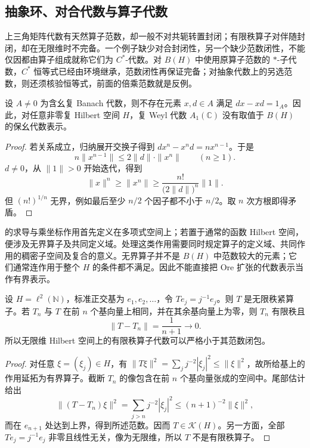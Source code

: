 \subsection{抽象环、对合代数与算子代数}
\label{b2:subsec:D01:03}

上三角矩阵代数有天然算子范数，却一般不对共轭转置封闭；有限秩算子对伴随封闭，却在无限维时不完备。一个例子缺少对合封闭性，另一个缺少范数闭性，不能仅因都由算子组成就称它们为 \(C^*\)-代数。对 \(B(H)\) 中使用原算子范数的 \(*\)-子代数，\(C^*\) 恒等式已经由环境继承，范数闭性再保证完备；对抽象代数上的另选范数，则还须核验恒等式，前面的倍乘范数就是反例。

\begin{proposition}\label{b2:prop:bounded-weyl-impossible}
	设 \(A\ne0\) 为含幺复 Banach 代数，则不存在元素 \(x,d\in A\) 满足 \(dx-xd=1_A\)。因此，对任意非零复 Hilbert 空间 \(H\)，复 Weyl 代数 \(A_1(\mathbb C)\) 没有取值于 \(B(H)\) 的保幺代数表示。
\end{proposition}
\begin{proof}
	若关系成立，归纳展开交换子得到 \(dx^n-x^nd=nx^{n-1}\)。于是
	\[
		n\|x^{n-1}\|\le 2\|d\|\cdot\|x^n\|\qquad(n\ge1).
	\]
	\(d\ne0\)，从 \(\|1\|>0\) 开始迭代，得到
	\[
		\|x\|^n\ge\|x^n\|\ge\frac{n!}{\bigl(2\|d\|\bigr)^n}\|1\|.
	\]
	但 \((n!)^{1/n}\) 无界，例如最后至少 \(n/2\) 个因子都不小于 \(n/2\)。取 \(n\) 次方根即得矛盾。
\end{proof}

的求导与乘坐标作用首先定义在多项式空间上；若置于通常的函数 Hilbert 空间，便涉及无界算子及共同定义域。处理这类作用需要同时规定算子的定义域、共同作用的稠密子空间及复合的意义。无界算子并不是 \(B(H)\) 中范数较大的元素；它们通常连作用于整个 \(H\) 的条件都不满足。因此不能直接把 Ore 扩张的代数表示当作有界表示。


\begin{proposition}\label{b2:prop:D-compact-not-finite-rank}
	设 \(H=\ell^2(\mathbb N)\)，标准正交基为 \(e_1,e_2,\ldots\)，令 \(Te_j=j^{-1}e_j\)。则 \(T\) 是无限秩紧算子。若 \(T_n\) 与 \(T\) 在前 \(n\) 个基向量上相同，并在其余基向量上为零，则 \(T_n\) 有限秩且
	\[
		\|T-T_n\|=\frac1{n+1}\longrightarrow0.
	\]
	所以无限维 Hilbert 空间上的有限秩算子代数可以严格小于其范数闭包。
\end{proposition}
\begin{proof}
	对任意 \(\xi=(\xi_j)\in H\)，有 \(\|T\xi\|^2=\sum_j j^{-2}|\xi_j|^2\le\|\xi\|^2\)，故所给基上的作用延拓为有界算子。截断 \(T_n\) 的像包含在前 \(n\) 个基向量张成的空间中。尾部估计给出
	\[
		\|(T-T_n)\xi\|^2=\sum_{j>n}j^{-2}|\xi_j|^2 \le(n+1)^{-2}\|\xi\|^2,
	\]
	而在 \(e_{n+1}\) 处达到上界，得到所述范数。因而 \(T\in\mathcal K(H)\)。另一方面，全部 \(Te_j=j^{-1}e_j\) 非零且线性无关，像为无限维，所以 \(T\) 不是有限秩算子。
\end{proof}
